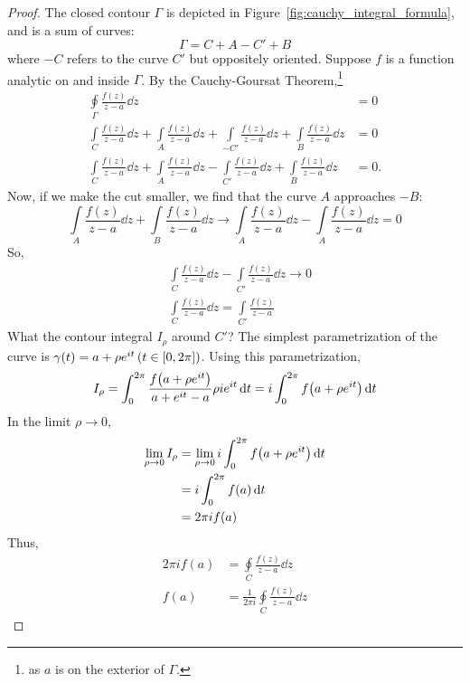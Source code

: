 \documentclass[10pt]{scrartcl}
\numberwithin{equation}{subsection}
\theoremstyle{definition}
\theoremstyle{remark}
\begin{document}
	\begin{proof}
		The closed contour $\Gamma$ is depicted in
		Figure~\ref{fig:cauchy_integral_formula}, and is a sum of curves:
		\[
			\Gamma = C + A - C' + B
		\]
		where $-C$ refers to the curve $C'$ but oppositely oriented.
		Suppose $f$ is a function analytic on and inside $\Gamma$. By
		the Cauchy-Goursat Theorem,\footnote{as $a$ is on the exterior of $\Gamma$.}
		\begin{align*}
			\oint\limits_\Gamma \frac{f(z)}{z-a} \dd{z} &= 0\\
			\int\limits_C \frac{f(z)}{z-a} \dd{z} +  \int\limits_A \frac{f(z)}{z-a} \dd{z} 
			+ \int\limits_{-C'} \frac{f(z)}{z-a} \dd{z} + \int\limits_B \frac{f(z)}{z-a} \dd{z} &= 0\\
			\int\limits_C \frac{f(z)}{z-a} \dd{z} +  \int\limits_A \frac{f(z)}{z-a} \dd{z} 
			- \int\limits_{C'} \frac{f(z)}{z-a} \dd{z} + \int\limits_B \frac{f(z)}{z-a} \dd{z} &= 0.
		\end{align*}
		Now, if we make the cut smaller, we find that the curve $A$ approaches
		$-B$:
		\[
			\int\limits_A \frac{f(z)}{z-a} \dd{z} + \int\limits_B
			\frac{f(z)}{z-a} \dd{z} \to \int\limits_A \frac{f(z)}{z-a} \dd{z} -
			\int\limits_A \frac{f(z)}{z-a} \dd{z} = 0
		\]
		So,
		\begin{align*}
			&\int\limits_C \frac{f(z)}{z-a} \dd{z} - \int\limits_{C'}
			\frac{f(z)}{z-a} \dd{z} \to 0\\
			&\int\limits_C \frac{f(z)}{z-a} \dd{z} = \int\limits_{C'} \frac{f(z)}{z-a}
		\end{align*}
		What the contour integral $I_\rho$ around $C'$? The simplest
		parametrization of the curve is $\gamma(t) = a + \rho e^{it}\,
		\pqty{t\in[0,2\pi]}$.  Using this parametrization, 
		\[
			I_\rho = \int_0^{2\pi} \frac{f\qty(a + \rho e^{it})}{a+e^{it}-a}
			\rho i e^{it} \dd{t} = i \int_0^{2\pi} f\pqty{a + \rho e^{it}}
			\dd{t}
		\]
		In the limit $\rho \to 0$, 
		\begin{align*}
			\lim_{\rho \to 0} I_\rho &= \lim_{\rho \to 0} i \int_0^{2\pi} f\pqty{a + \rho e^{it}} \dd{t} \\
									 &= i \int_0^{2\pi} f(a) \dd{t} \\
									 &= 2\pi i f(a)
		\end{align*}
		Thus,
		\begin{align*}
			2\pi i f(a) &= \oint\limits_C \frac{f(z)}{z-a} \dd{z}\\
			f(a) &= \frac{1}{2\pi i}\oint\limits_C \frac{f(z)}{z-a} \dd{z}
		\end{align*}
	\end{proof}
\end{document}
